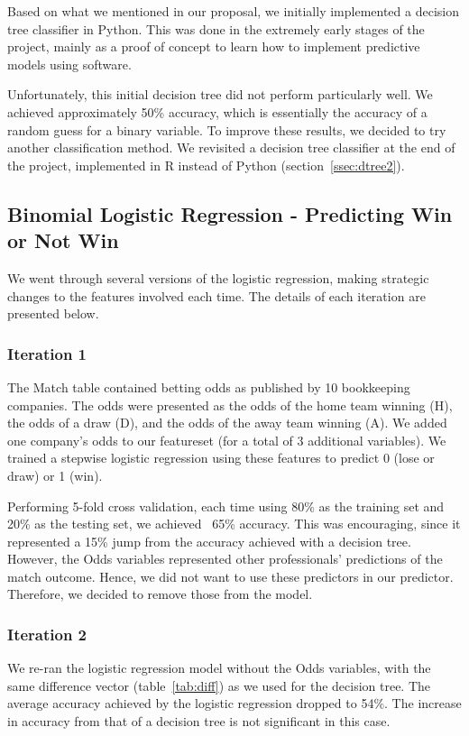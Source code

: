 \documentclass[11pt]{article}
\begin{document}
Based on what we mentioned in our proposal, we initially implemented a decision tree classifier in Python.
This was done in the extremely early stages of the project, mainly as a proof of concept to learn how to implement predictive models using software.

Unfortunately, this initial decision tree did not perform particularly well.
We achieved approximately 50\% accuracy, which is essentially the accuracy of a random guess for a binary variable.
To improve these results, we decided to try another classification method.
We revisited a decision tree classifier at the end of the project, implemented in R instead of Python (section~\ref{ssec:dtree2}).

\subsection{Binomial Logistic Regression - Predicting Win or Not Win}
We went through several versions of the logistic regression, making strategic changes to the features involved each time. The details of each iteration are presented below.

\subsubsection{Iteration 1}
The Match table contained betting odds as published by 10 bookkeeping companies.
The odds were presented as the odds of the home team winning (H), the odds of a draw (D), and the odds of the away team winning (A).
We added one company's odds to our featureset (for a total of 3 additional variables).
We trained a stepwise logistic regression using these features to predict 0 (lose or draw) or 1 (win).

Performing 5-fold cross validation, each time using 80\% as the training set and 20\% as the testing set, we achieved ~65\% accuracy.
This was encouraging, since it represented a 15\% jump from the accuracy achieved with a decision tree.
However, the Odds variables represented other professionals' predictions of the match outcome.
Hence, we did not want to use these predictors in our predictor. Therefore, we decided to remove those from the model.

\subsubsection{Iteration 2}
We re-ran the logistic regression model without the Odds variables, with the same difference vector (table~\ref{tab:diff}) as we used for the decision tree. The average accuracy achieved by the logistic regression dropped to 54\%. The increase in accuracy from that of a decision tree is not significant in this case.
\end{document}
